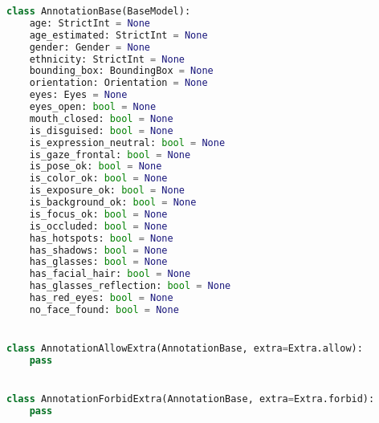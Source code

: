 \clearpage

\begin{minipage}[t]{\linewidth}
\begin{lstlisting}[language=python,title=AnnotationSchema.py,firstnumber=34]
class AnnotationBase(BaseModel):
    age: StrictInt = None
    age_estimated: StrictInt = None
    gender: Gender = None
    ethnicity: StrictInt = None
    bounding_box: BoundingBox = None
    orientation: Orientation = None
    eyes: Eyes = None
    eyes_open: bool = None
    mouth_closed: bool = None
    is_disguised: bool = None
    is_expression_neutral: bool = None
    is_gaze_frontal: bool = None
    is_pose_ok: bool = None
    is_color_ok: bool = None
    is_exposure_ok: bool = None
    is_background_ok: bool = None
    is_focus_ok: bool = None
    is_occluded: bool = None
    has_hotspots: bool = None
    has_shadows: bool = None
    has_glasses: bool = None
    has_facial_hair: bool = None
    has_glasses_reflection: bool = None
    has_red_eyes: bool = None
    no_face_found: bool = None


class AnnotationAllowExtra(AnnotationBase, extra=Extra.allow):
    pass


class AnnotationForbidExtra(AnnotationBase, extra=Extra.forbid):
    pass
\end{lstlisting}
\end{minipage}

